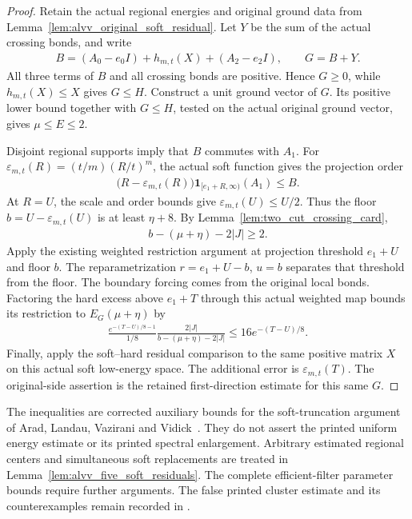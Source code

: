 \begin{proof}\leanok
    Retain the actual regional energies and original ground data from
    Lemma~\ref{lem:alvv_original_soft_residual}. Let $Y$ be the sum of
    the actual crossing bonds, and write
    \begin{align}
        B=(A_0-e_0I)+h_{m,t}(X)+(A_2-e_2I),\qquad G=B+Y.
    \end{align}
    All three terms of $B$ and all crossing bonds are positive.
    Hence $G\geq0$, while $h_{m,t}(X)\leq X$ gives $G\leq H$.
    Construct a unit ground vector of $G$. Its positive lower bound
    together with $G\leq H$, tested on the actual original ground
    vector, gives $\mu\leq E\leq2$.

    Disjoint regional supports imply that $B$ commutes with $A_1$.
    For $\varepsilon_{m,t}(R)=(t/m)(R/t)^m$, the actual soft function
    gives the projection order
    \begin{align}
        \bigl(R-\varepsilon_{m,t}(R)\bigr)
        \mathbf1_{[e_1+R,\infty)}(A_1)\leq B.
    \end{align}
    At $R=U$, the scale and order bounds give
    $\varepsilon_{m,t}(U)\leq U/2$. Thus the floor
    $b=U-\varepsilon_{m,t}(U)$ is at least $\eta+8$.
    By Lemma~\ref{lem:two_cut_crossing_card},
    \begin{align}
        b-(\mu+\eta)-2|J|\geq2.
    \end{align}
    Apply the existing weighted restriction argument at projection
    threshold $e_1+U$ and floor $b$. The reparametrization
    $r=e_1+U-b$, $u=b$ separates that threshold from the floor.
    The boundary forcing comes from the original local bonds.
    Factoring the hard excess above $e_1+T$ through this actual
    weighted map bounds its restriction to $E_G(\mu+\eta)$ by
    \begin{align}
        \frac{e^{-(T-U)/8-1}}{1/8}
        \frac{2|J|}{b-(\mu+\eta)-2|J|}
        \leq16e^{-(T-U)/8}.
    \end{align}
    Finally, apply the soft--hard residual comparison to the same
    positive matrix $X$ on this actual soft low-energy space.
    The additional error is $\varepsilon_{m,t}(T)$.
    The original-side assertion is the retained first-direction
    estimate for this same $G$.
\end{proof}

The inequalities are corrected auxiliary bounds for the soft-truncation
argument of Arad, Landau, Vazirani and Vidick~\cite[lines 1195--1255]{Arad2016RigorousRG}.
They do not assert the printed uniform energy estimate or its printed
spectral enlargement. Arbitrary estimated regional centers and simultaneous soft replacements
are treated in Lemma~\ref{lem:alvv_five_soft_residuals}. The complete
efficient-filter parameter bounds require further arguments. The false printed cluster estimate
and its counterexamples remain recorded in
\cite{gap:alvv16_cluster_approximation}.
